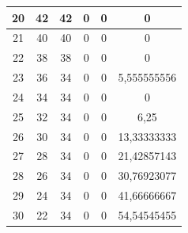 \begin{table}[]
\begin{tabular}{|c|c|c|c|c|c|}
 			20                                           & 42                     & 42                    & 0                     & 0                      & 0                                                  \\ \hline
 			21                                           & 40                     & 40                    & 0                     & 0                      & 0                                                  \\ \hline
 			22                                           & 38                     & 38                    & 0                     & 0                      & 0                                                  \\ \hline
 			23                                           & 36                     & 34                    & 0                     & 0                      & 5,555555556                                        \\ \hline
 			24                                           & 34                     & 34                    & 0                     & 0                      & 0                                                  \\ \hline
 			25                                           & 32                     & 34                    & 0                     & 0                      & 6,25                                               \\ \hline
 			26                                           & 30                     & 34                    & 0                     & 0                      & 13,33333333                                        \\ \hline
 			27                                           & 28                     & 34                    & 0                     & 0                      & 21,42857143                                        \\ \hline
 			28                                           & 26                     & 34                    & 0                     & 0                      & 30,76923077                                        \\ \hline
 			29                                           & 24                     & 34                    & 0                     & 0                      & 41,66666667                                        \\ \hline
 			30                                           & 22                     & 34                    & 0                     & 0                      & 54,54545455                                        \\ \hline

\end{tabular}
\end{table}
